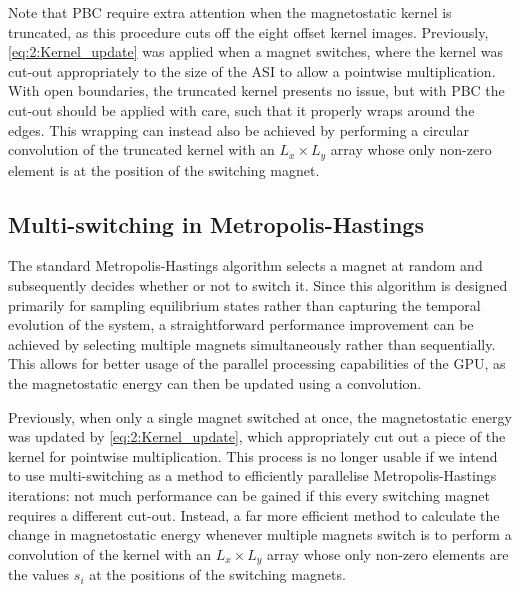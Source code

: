 Note that PBC require extra attention when the magnetostatic kernel is truncated, as this procedure cuts off the eight offset kernel images.
Previously, \cref{eq:2:Kernel_update} was applied when a magnet switches, where the kernel was cut-out appropriately to the size of the ASI to allow a pointwise multiplication.
With open boundaries, the truncated kernel presents no issue, but with PBC the cut-out should be applied with care, such that it properly wraps around the edges.
This wrapping can instead also be achieved by performing a circular convolution of the truncated kernel with an $L_x \times L_y$ array whose only non-zero element is at the position of the switching magnet.

\subsection{Multi-switching in Metropolis-Hastings} \label{sec:2:MultiSwitch}
The standard Metropolis-Hastings algorithm selects a magnet at random and subsequently decides whether or not to switch it.
Since this algorithm is designed primarily for sampling equilibrium states rather than capturing the temporal evolution of the system, a straightforward performance improvement can be achieved by selecting multiple magnets simultaneously rather than sequentially.
This allows for better usage of the parallel processing capabilities of the GPU, as the magnetostatic energy can then be updated using a convolution. \par
Previously, when only a single magnet switched at once, the magnetostatic energy was updated by \cref{eq:2:Kernel_update}, which appropriately cut out a piece of the kernel for pointwise multiplication.
This process is no longer usable if we intend to use multi-switching as a method to efficiently parallelise Metropolis-Hastings iterations: not much performance can be gained if this every switching magnet requires a different cut-out.
Instead, a far more efficient method to calculate the change in magnetostatic energy whenever multiple magnets switch is to perform a convolution of the kernel with an $L_x \times L_y$ array whose only non-zero elements are the values $s_i$ at the positions of the switching magnets.

